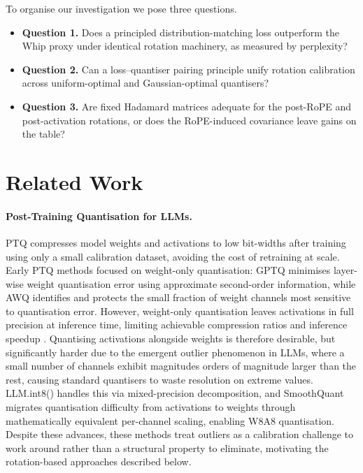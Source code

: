 \documentclass[11pt,a4paper]{article}
\begin{document}
To organise our investigation we pose three questions.
\begin{itemize}
    \item \textbf{Question 1.} Does a principled distribution-matching loss outperform the Whip proxy under identical rotation machinery, as measured by perplexity?
    \item \textbf{Question 2.} Can a loss--quantiser pairing principle unify rotation calibration across uniform-optimal and Gaussian-optimal quantisers?
    \item \textbf{Question 3.} Are fixed Hadamard matrices adequate for the post-RoPE and post-activation rotations, or does the RoPE-induced covariance leave gains on the table?
\end{itemize}

\section{Related Work}
\label{sec:related}

\paragraph{Post-Training Quantisation for LLMs.}
PTQ compresses model weights and activations to low bit-widths after training using only a small calibration dataset, avoiding the cost of retraining at scale.
Early PTQ methods focused on weight-only quantisation: GPTQ \citep{gptq} minimises layer-wise weight quantisation error using approximate second-order information, while AWQ \citep{awq} identifies and protects the small fraction of weight channels most sensitive to quantisation error.
However, weight-only quantisation leaves activations in full precision at inference time, limiting achievable compression ratios and inference speedup \citep{smoothquant}.
Quantising activations alongside weights is therefore desirable, but significantly harder due to the emergent outlier phenomenon in LLMs, where a small number of channels exhibit magnitudes orders of magnitude larger than the rest, causing standard quantisers to waste resolution on extreme values.
LLM.int8() \citep{llmint8} handles this via mixed-precision decomposition, and SmoothQuant \citep{smoothquant} migrates quantisation difficulty from activations to weights through mathematically equivalent per-channel scaling, enabling W8A8 quantisation.
Despite these advances, these methods treat outliers as a calibration challenge to work around rather than a structural property to eliminate, motivating the rotation-based approaches described below.
\end{document}

